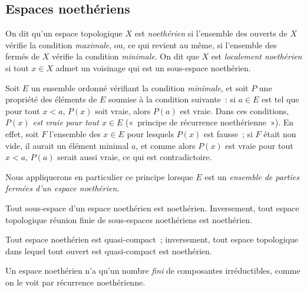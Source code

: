 
\subsection{Espaces noethériens}
\label{subsection:0.2.2-fr}

\begin{env}[2.2.1]
\label{0.2.2.1-fr}
On dit qu'un espace topologique $X$ est \emph{noethérien} si l'ensemble des
ouverts de $X$ vérifie la condition \emph{maximale}, ou, ce qui revient au
même, si l'ensemble des fermés de $X$ vérifie la condition \emph{minimale}. On
dit que $X$ est \emph{localement noethérien} si tout $x\in X$ admet un
voisinage qui est un sous-espace noethérien.
\end{env}

\begin{env}[2.2.2]
\label{0.2.2.2-fr}
Soit $E$ un ensemble ordonné vérifiant la condition \emph{minimale}, et soit
$P$ une propriété des éléments de $E$ soumise à la condition suivante~: si
$a\in E$ est tel que pour tout $x<a$, $P(x)$ soit vraie, alors $P(a)$ est
vraie. Dans ces conditions, \emph{$P(x)$ est vraie pour tout $x\in E$}
(«~principe de récurrence noethérienne~»). En effet, soit $F$ l'ensemble des
$x\in E$ pour lesquels $P(x)$ est fausse~; si $F$ était non vide, il aurait un
élément minimal $a$, et comme alors $P(x)$ est vraie pour tout $x<a$, $P(a)$
serait aussi vraie, ce qui est contradictoire.

Nous appliquerons en particulier ce principe lorsque $E$ est un \emph{ensemble
de parties fermées d'un espace noethérien}.
\end{env}

\begin{env}[2.2.3]
\label{0.2.2.3-fr}
Tout sous-espace d'un espace noethérien est noethérien. Inversement, tout
espace topologique réunion finie de sous-espaces noethériens est noethérien.
\end{env}

\begin{env}[2.2.4]
\label{0.2.2.4-fr}
Tout espace noethérien est quasi-compact~; inversement, tout espace topologique
dans lequel tout ouvert est quasi-compact est noethérien.
\end{env}

\begin{env}[2.2.5]
\label{0.2.2.5-fr}
Un espace noethérien n'a qu'un nombre \emph{fini} de composantes
irréductibles, comme on le voit par récurrence noethérienne.
\end{env}

